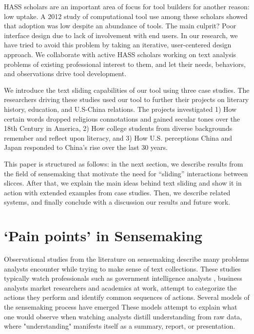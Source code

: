 \documentclass{sig-alternate}
\begin{document}
HASS scholars are an important area of focus for tool builders for another reason: low uptake. A 2012 study of computational tool use among these scholars showed that adoption was low despite an abundance of tools. The main culprit? Poor interface design due to lack of involvement with end users. In our research, we have tried to avoid this problem by taking an iterative, user-centered design approach. We collaborate with active HASS scholars working on text analysis problems of existing professional interest to them, and let their needs, behaviors, and observations drive tool development.

We introduce the text sliding capabilities of our tool using three case studies. The researchers driving these studies used our tool to further their projects on literary history, education, and U.S-China relations. The projects investigated 1) How certain words dropped religious connotations and gained secular tones over the 18th Century in America, 2) How college students from diverse backgrounds remember and reflect upon literacy, and 3) How U.S. perceptions China and Japan responded to China's rise over the last 30 years.

This paper is structured as follows: in the next section, we describe results from the field of sensemaking that motivate the need for ``sliding'' interactions between slicces. After that, we explain the main ideas behind text sliding and show it in action with extended examples from case studies. Then, we describe related systems, and finally conclude with a discussion our results and future work.

\section{`Pain points' in Sensemaking}
Observational studies from the literature on sensemaking describe many problems analysts encounter while trying to make sense of text collections. These studies typically watch professionals such as government intelligence analysts \cite{x}, business analysts \cite{x} market researchers \cite{x} and academics \cite{x} at work, attempt to categorize the actions they perform and identify common sequences of actions. Several models of the sensemaking process have emerged \cite{x} These models attempt to explain what one would observe when watching analysts distill understanding from raw data, where "understanding" manifests itself as a summary, report, or presentation.
\end{document}

